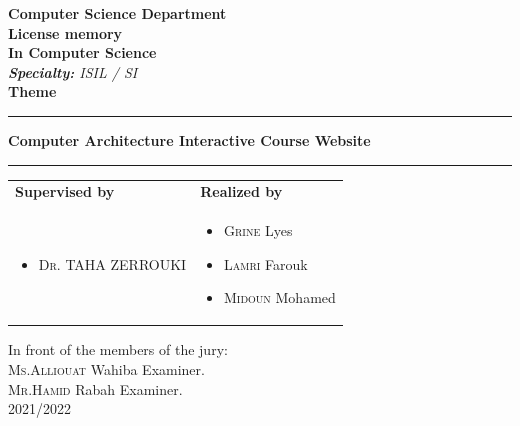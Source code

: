 \begin{titlepage}
\begin{center}
{ \textbf{Computer Science Department}}\\ \vspace{0.5cm}
\Huge{\textbf{License memory}} \\ \Large{\textbf{In Computer Science}} \\\vspace{0.3cm}
\large{\emph{\textbf{Specialty: } ISIL / SI}}\\ \vspace{0.8cm}
\huge{\textbf{Theme}}\\ %
\noindent\rule{\textwidth}{1mm}
\Large{\textbf{Computer Architecture Interactive Course Website}}
\noindent\rule{\textwidth}{1mm}
\end{center}
\vspace{0.3cm}
\begin{tabular}{ p{9cm}  p{6cm} }
\textbf{Supervised by} & \textbf{Realized by} \\
\begin{itemize}
	\item \textsc{Dr.} TAHA ZERROUKI
\end{itemize}
&
\begin{itemize}
	\item \textsc{Grine} Lyes
  \item \textsc{Lamri} Farouk
	\item \textsc{Midoun} Mohamed
\end{itemize}
\\
\end{tabular}
\vspace{0.5cm}
\begin{center}
  In front of the members of the jury:\\
  \textsc{Ms.Alliouat} Wahiba Examiner.\\
  \textsc{Mr.Hamid} Rabah Examiner.\\
  \vspace{0.3cm}
2021/2022
\end{center}

\end{titlepage}